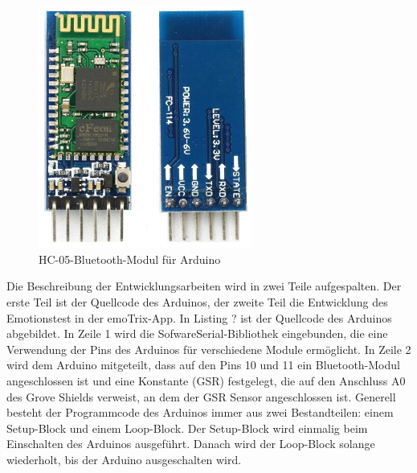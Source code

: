 \begin{figure}[h]
	\centering
	\includegraphics[width=7cm]{Bilder/hc05.jpg}
	\caption[HC-05-Bluetooth-Modul für Arduino]{HC-05-Bluetooth-Modul für Arduino\footnotemark}
\end{figure}%
\newline
Die Beschreibung der Entwicklungsarbeiten wird in zwei Teile aufgespalten. Der erste Teil ist der Quellcode des Arduinos, der zweite Teil die Entwicklung des Emotionstest in der emoTrix-App. \newline
In Listing ? ist der Quellcode des Arduinos abgebildet. In Zeile 1 wird die SofwareSerial-Bibliothek eingebunden, die eine Verwendung der Pins des Arduinos für verschiedene Module ermöglicht. In Zeile 2 wird dem Arduino mitgeteilt, dass auf den Pins 10 und 11 ein Bluetooth-Modul angeschlossen ist und eine Konstante (GSR) festgelegt, die auf den Anschluss A0 des Grove Shields verweist, an dem der GSR Sensor angeschlossen ist. \newline
Generell besteht der Programmcode des Arduinos immer aus zwei Bestandteilen: einem Setup-Block und einem Loop-Block. Der Setup-Block wird einmalig beim Einschalten des Arduinos ausgeführt. Danach wird der Loop-Block solange wiederholt, bis der Arduino ausgeschalten wird. \newline \newline 

